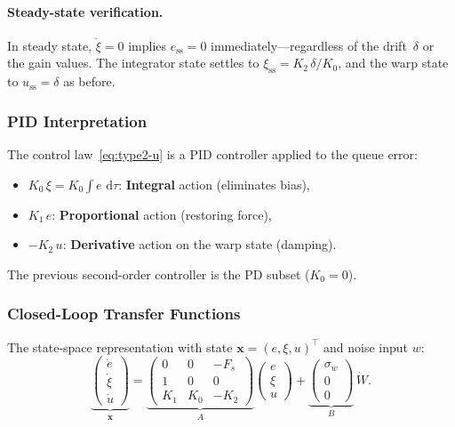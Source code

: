 \documentclass[11pt, a4paper]{article}
\theoremstyle{definition}
\theoremstyle{plain}
\theoremstyle{remark}
\newcommand{\dd}{\,\mathrm{d}}                   %
\begin{document}
\paragraph{Steady-state verification.}
In steady state, $\dot{\xi} = 0$ implies $e_{\text{ss}} = 0$
immediately---regardless of the drift~$\delta$ or the gain
values.  The integrator state settles to
$\xi_{\text{ss}} = K_2\,\delta/K_0$, and the warp state to
$u_{\text{ss}} = \delta$ as before.

\subsubsection{PID Interpretation}

The control law~\eqref{eq:type2-u} is a PID controller applied to
the queue error:
\begin{itemize}
  \item $K_0\,\xi = K_0\!\int\!e\,\dd\tau$: \textbf{Integral}
    action (eliminates bias),
  \item $K_1\,e$: \textbf{Proportional} action (restoring force),
  \item $-K_2\,u$: \textbf{Derivative} action on the warp state
    (damping).
\end{itemize}
The previous second-order controller is the PD subset ($K_0 = 0$).

\subsubsection{Closed-Loop Transfer Functions}

The state-space representation with state $\mathbf{x} = (e, \xi, u)^\top$
and noise input $w$:
\begin{equation}
  \underbrace{
  \begin{pmatrix} \dot{e} \\ \dot{\xi} \\ \dot{u} \end{pmatrix}
  }_{\dot{\mathbf{x}}}
  =
  \underbrace{
  \begin{pmatrix}
    0 & 0 & -F_s \\
    1 & 0 & 0 \\
    K_1 & K_0 & -K_2
  \end{pmatrix}
  }_{A}
  \begin{pmatrix} e \\ \xi \\ u \end{pmatrix}
  +
  \underbrace{
  \begin{pmatrix} \sigma_w \\ 0 \\ 0 \end{pmatrix}
  }_{B}\,\dot{W}.
\end{equation}
\end{document}
